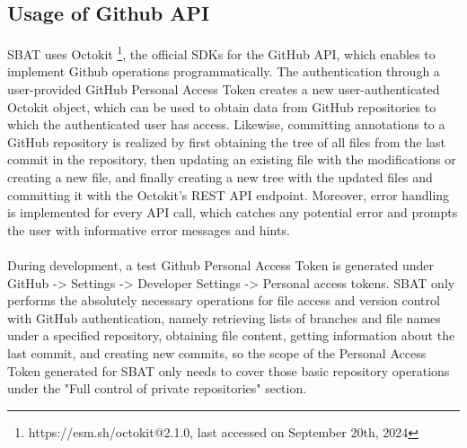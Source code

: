 \documentclass[12ptm a4paper]{article}
\begin{document}
\subsection{Usage of Github API}
SBAT uses Octokit \footnote{https://esm.sh/octokit@2.1.0, last accessed on September 20th, 2024}, the official SDKs for the GitHub API, which enables to implement Github operations programmatically. The authentication through a user-provided GitHub Personal Access Token creates a new user-authenticated Octokit object, which can be used to obtain data from GitHub repositories to which the authenticated user has access. Likewise, committing annotations to a GitHub repository is realized by first obtaining the tree of all files from the last commit in the repository, then updating an existing file with the modifications or creating a new file, and finally creating a new tree with the updated files and committing it with the Octokit's REST API endpoint. Moreover, error handling is implemented for every API call, which catches any potential error and prompts the user with informative error messages and hints.\\
\\
During development, a test Github Personal Access Token is generated under GitHub -> Settings -> Developer Settings -> Personal access tokens. SBAT only performs the absolutely necessary operations for file access and version control with GitHub authentication, namely retrieving lists of branches and file names under a specified repository, obtaining file content, getting information about the last commit, and creating new commits, so the scope of the Personal Access Token generated for SBAT only needs to cover those basic repository operations under the "Full control of private repositories" section.
\newpage
\end{document}
